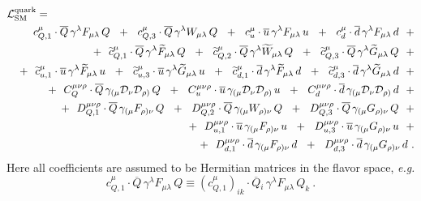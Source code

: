 \documentclass[12pt,preprintnumbers,nofootinbib]{revtex4}
\newcommand{\wt}{\widetilde}
\newcommand{\ov}{\overline}
\newcommand{\md}{\mathcal{D}}
\begin{document}
\begin{eqnarray}
\nonumber
\lefteqn{
	\mathcal{L}_{\rm SM}^{\rm quark} =
	}
	\\
\nonumber
	&&
	\phantom{+~~}
	c_{Q,1}^\mu \cdot
	\ov{Q}\, \gamma^\lambda F_{\mu\lambda}\, Q 
	~~+~~
	c_{Q,3}^\mu \cdot
	\ov{Q}\, \gamma^\lambda W_{\mu\lambda}\, Q 
	~~+~~
	c_{u}^\mu \cdot
	\ov{u}\, \gamma^\lambda F_{\mu\lambda}\, u
	~~+~~ 
	c_{d}^\mu \cdot
	\ov{d}\, \gamma^\lambda F_{\mu\lambda}\, d
	~~+
	\\
\label{SM_quark}
	&&
	+~~
	\wt{c}_{Q,1}^\mu \cdot
	\ov{Q}\, \gamma^\lambda \wt{F}_{\mu\lambda}\, Q 
	~~+~~
	\wt{c}_{Q,2}^\mu \cdot
	\ov{Q}\, \gamma^\lambda \wt{W}_{\mu\lambda}\, Q 
	~~+~~
	\wt{c}_{Q,3}^\mu \cdot
	\ov{Q}\, \gamma^\lambda \wt{G}_{\mu\lambda}\, Q 
	~~+
	\\
\nonumber
	&&
	+~~
	\wt{c}_{u,1}^\mu \cdot
	\ov{u}\, \gamma^\lambda \wt{F}_{\mu\lambda}\, u
	~~+~~ 
	\wt{c}_{u,3}^\mu \cdot
	\ov{u}\, \gamma^\lambda \wt{G}_{\mu\lambda}\, u
	~~+~~ 
	\wt{c}_{d,1}^\mu \cdot
	\ov{d}\, \gamma^\lambda \wt{F}_{\mu\lambda}\, d
	~~+~~ 
	\wt{c}_{d,3}^\mu \cdot
	\ov{d}\, \gamma^\lambda \wt{G}_{\mu\lambda}\, d
	~~+
	\\
\nonumber
	&&
	+~~
	C_Q^{\mu\nu\rho} \cdot
	\ov{Q}\, \gamma_{(\mu} \md_\nu \md_{\rho)}\, Q
	~~+~~
	C_u^{\mu\nu\rho} \cdot
	\ov{u}\, \gamma_{(\mu} \md_\nu \md_{\rho)}\, u
	~~+~~
	C_d^{\mu\nu\rho} \cdot
	\ov{d}\, \gamma_{(\mu} \md_\nu \md_{\rho)}\, d
	~~+
	\\
\nonumber
	&&
	+~~
	D_{Q,1}^{\mu\nu\rho} \cdot
	\ov{Q}\, \gamma_{(\mu} F_{\rho)\nu}\, Q
	~~+~~
	D_{Q,2}^{\mu\nu\rho} \cdot
	\ov{Q}\, \gamma_{(\mu} W_{\rho)\nu}\, Q
	~~+~~
	D_{Q,3}^{\mu\nu\rho} \cdot
	\ov{Q}\, \gamma_{(\mu} G_{\rho)\nu}\, Q
	~~+
	\\
\nonumber
	&&
	+~~
	D_{u,1}^{\mu\nu\rho} \cdot
	\ov{u}\, \gamma_{(\mu} F_{\rho)\nu}\, u
	~~+~~
	D_{u,3}^{\mu\nu\rho} \cdot
	\ov{u}\, \gamma_{(\mu} G_{\rho)\nu}\, u
	~~+
	\\
\notag
	&&
	+~~
	D_{d,1}^{\mu\nu\rho} \cdot
	\ov{d}\, \gamma_{(\mu} F_{\rho)\nu}\, d
	~~+~~
	D_{d,3}^{\mu\nu\rho} \cdot
	\ov{d}\, \gamma_{(\mu} G_{\rho)\nu}\, d
	~.
\end{eqnarray}
	Here all coefficients are assumed to be Hermitian matrices in the 
	flavor space, {\it e.g.}
\[
	c_{Q,1}^\mu \cdot
	\ov{Q}\, \gamma^\lambda F_{\mu\lambda}\, Q 
	\equiv
	\left(c_{Q,1}^\mu\right)_{ik} \cdot
	\ov{Q}{}_i\, \gamma^\lambda F_{\mu\lambda}\, Q_k
	~. 
\]
\end{document}
